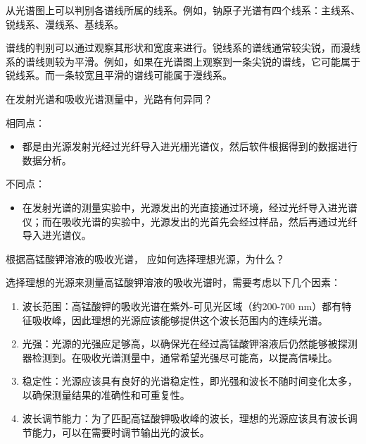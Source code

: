\documentclass[dvipsnames, svgnames,a4paper,11pt]{article}
\begin{document}
	从光谱图上可以判别各谱线所属的线系。例如，钠原子光谱有四个线系：主线系、锐线系、漫线系、基线系。
	
%		
%		
%		
	
	
	谱线的判别可以通过观察其形状和宽度来进行。锐线系的谱线通常较尖锐，而漫线系的谱线则较为平滑。例如，如果在光谱图上观察到一条尖锐的谱线，它可能属于锐线系。而一条较宽且平滑的谱线可能属于漫线系。
	
	
\begin{question}
	在发射光谱和吸收光谱测量中，光路有何异同？
\end{question}
	
	相同点：
	\begin{itemize}
		\item 都是由光源发射光经过光纤导入进光栅光谱仪，然后软件根据得到的数据进行数据分析。
	
		
	\end{itemize}
	
	不同点：
	\begin{itemize}
		\item 在发射光谱的测量实验中，光源发出的光直接通过环境，经过光纤导入进光谱仪；而在吸收光谱的实验中，光源发出的光首先会经过样品，然后再通过光纤导入进光谱仪。
		
		
	\end{itemize}
	
	
	
\begin{question}
	根据高锰酸钾溶液的吸收光谱， 应如何选择理想光源，为什么？
\end{question}
	
	选择理想的光源来测量高锰酸钾溶液的吸收光谱时，需要考虑以下几个因素：
	
	\begin{enumerate}
		\item 波长范围：高锰酸钾的吸收光谱在紫外-可见光区域（约200-700 nm）都有特征吸收峰，因此理想的光源应该能够提供这个波长范围内的连续光谱。
		
		\item 光强：光源的光强应足够高，以确保光在经过高锰酸钾溶液后仍然能够被探测器检测到。在吸收光谱测量中，通常希望光强尽可能高，以提高信噪比。
		
		\item 稳定性：光源应该具有良好的光谱稳定性，即光强和波长不随时间变化太多，以确保测量结果的准确性和可重复性。
		
		\item 波长调节能力：为了匹配高锰酸钾吸收峰的波长，理想的光源应该具有波长调节能力，可以在需要时调节输出光的波长。
		
		
	\end{enumerate}
	
\end{document}
